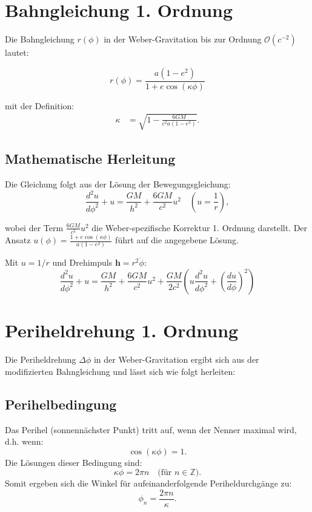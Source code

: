 \newpage
\section{Bahngleichung 1. Ordnung}
Die Bahngleichung \(r(\phi)\) in der Weber-Gravitation bis zur Ordnung \(\mathcal{O}(c^{-2})\) lautet:

\begin{equation}
\label{eq:bahngleichung_1_ordnung}
r(\phi) = \frac{a(1 - e^2)}{1 + e \cos\left(\kappa\phi\right)}
\end{equation}

\noindent mit der Definition:
\begin{align*}
\kappa &= \sqrt{1 - \frac{6GM}{c^2a(1 - e^2)}}.
\end{align*}

\subsection*{Mathematische Herleitung}
Die Gleichung folgt aus der Lösung der Bewegungsgleichung:
\begin{equation}
\frac{d^2u}{d\phi^2} + u = \frac{GM}{h^2} + \frac{6GM}{c^2} u^2 \quad \left(u = \frac{1}{r}\right),
\end{equation}

wobei der Term \(\frac{6GM}{c^2} u^2\) die Weber-spezifische Korrektur 1. Ordnung darstellt. Der Ansatz \(u(\phi) = \frac{1 + e \cos(\kappa\phi)}{a(1 - e^2)}\) führt auf die angegebene Lösung.

Mit $u=1/r$ und Drehimpuls $\mathbf{h}=r^2\dot{\phi}$:
\begin{equation}
\frac{d^2u}{d\phi^2} + u = \frac{GM}{h^2} + \frac{6GM}{c^2}u^2 + \frac{GM}{2c^2}\left(u\frac{d^2u}{d\phi^2} + \left(\frac{du}{d\phi}\right)^2\right)
\end{equation}

\section{Periheldrehung 1. Ordnung}
Die Periheldrehung $\Delta\phi$ in der Weber-Gravitation ergibt sich aus der modifizierten Bahngleichung und lässt sich wie folgt herleiten:

\subsection{Perihelbedingung}
Das Perihel (sonnennächster Punkt) tritt auf, wenn der Nenner maximal wird, d.h. wenn:
\begin{equation}
\cos(\kappa\phi) = 1.
\end{equation}
Die Lösungen dieser Bedingung sind:
\begin{equation}
\kappa\phi = 2\pi n \quad \text{(für $n \in \mathbb{Z}$)}.
\end{equation}
Somit ergeben sich die Winkel für aufeinanderfolgende Periheldurchgänge zu:
\begin{equation}
\phi_n = \frac{2\pi n}{\kappa}.
\end{equation}


